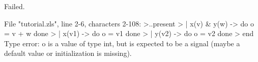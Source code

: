 \chklistingfalse
{}
\begin{ChkListingMsg}
Failed.
\end{ChkListingMsg}
\begin{ChkListingErr}
File "tutorial.zls", line 2-6, characters 2-108:
>..present
>  | x(v) & y(w) -> do o = v + w done
>  | x(v1) -> do o = v1 done
>  | y(v2) -> do o = v2 done
>  end
Type error: o is a value of type
int,
but is expected to be a signal (maybe a default value or initialization is missing).
\end{ChkListingErr}
